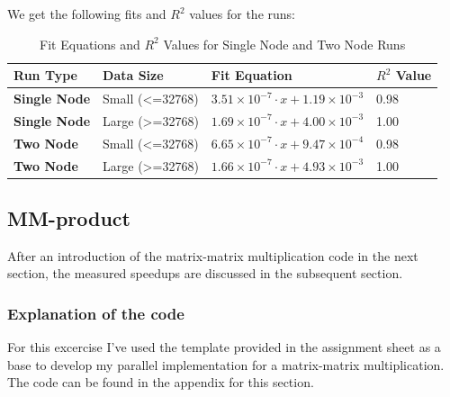We get the following fits and $R^2$ values for the runs:
\begin{table}[h!]
    \centering
    \begin{tabular}{|l|l|l|l|}
        \hline
        \textbf{Run Type}   & \textbf{Data Size} & \textbf{Fit Equation}                                      & \textbf{$R^2$ Value} \\ \hline
        \textbf{Single Node} & Small (<=32768)  & $3.51 \times 10^{-7} \cdot x + 1.19 \times 10^{-3}$        & 0.98              \\ \hline
        \textbf{Single Node} & Large (>=32768)  & $1.69 \times 10^{-7} \cdot x + 4.00 \times 10^{-3}$        & 1.00              \\ \hline
        \textbf{Two Node}    & Small (<=32768)  & $6.65 \times 10^{-7} \cdot x + 9.47 \times 10^{-4}$        & 0.98              \\ \hline
        \textbf{Two Node}    & Large (>=32768)  & $1.66 \times 10^{-7} \cdot x + 4.93 \times 10^{-3}$        & 1.00              \\ \hline
    \end{tabular}
    \caption{Fit Equations and $R^2$ Values for Single Node and Two Node Runs}
\end{table}


\subsection{MM-product}
After an introduction of the matrix-matrix multiplication code in the next section, the measured speedups are discussed in the subsequent section.
\subsubsection*{Explanation of the code}
For this excercise I've used the template provided in the assignment sheet as a base to develop my parallel implementation for a matrix-matrix multiplication. The code can be found in the appendix for this section. \\

